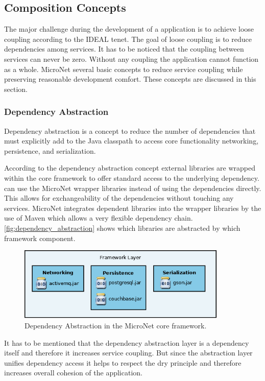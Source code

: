 \subsection{Composition Concepts}

The major challenge during the development of a \ms{} application is to achieve
loose coupling according to the IDEAL tenet. The goal of loose coupling is to
reduce dependencies among services. It has to be noticed that the coupling
between services can never be zero. Without any coupling the application cannot
function as a whole. MicroNet several basic concepts to reduce service coupling
while preserving reasonable development comfort. These concepts are discussed in
this section.

\subsubsection{Dependency Abstraction}

Dependency abstraction is a concept to reduce the number of dependencies
that \mss{} must explicitly add to the Java classpath to access core
functionality networking, persistence, and serialization.

According to the dependency abstraction concept external libraries are wrapped
within the core framework to offer standard access to the underlying dependency.
\mss{} can use the MicroNet wrapper libraries instead of using the
dependencies directly. This allows for exchangeability of the dependencies
without touching any \mss{} services. MicroNet integrates dependent libraries
into the wrapper libraries by the use of Maven which allows a very flexible
dependency chain. \autoref{fig:dependency_abstraction} shows which libraries are
abstracted by which framework component.

\begin{figure}
	\centering
	\includegraphics[width=10cm]{images/architecture/DependencyAbstraction}
	\caption{Dependency Abstraction in the MicroNet core framework.}
	\label{fig:dependency_abstraction}
\end{figure}

It has to be mentioned that the dependency abstraction layer is a dependency
itself and therefore it increases service coupling. But since the abstraction
layer unifies dependency access it helps to respect the \gls{dry}
principle and therefore increases overall cohesion of the application. 

